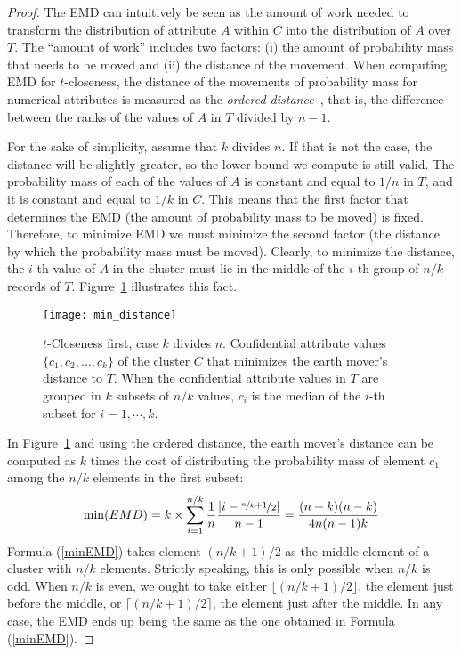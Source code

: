 \documentclass[10pt,journal,compsoc]{IEEEtran}
\theoremstyle{definition}
\theoremstyle{plain}
\begin{document}
\begin{proof}
	The EMD can intuitively be seen as the amount of work needed to transform
	the distribution of attribute $A$ within $C$ into 
the distribution of $A$ over $T$. The ``amount
	of work'' includes two factors: (i) the amount of probability mass
	that needs to be moved and (ii) the distance of the movement. When
	computing EMD for $t$-closeness, the distance of the movements
	of probability mass for numerical attributes is measured as the 
{\em ordered distance}~\cite{Li2007t-Closeness},
	that is, the difference between the ranks of the values of $A$ in $T$
	divided by $n-1$.
	
	For the sake of simplicity, assume that $k$ divides $n$. If that
	is not the case, the distance will be slightly greater, so the lower
	bound we compute is still valid. The probability mass of each of the
	values of $A$ is constant and equal to $1/n$ in $T$, and it 
is  constant and equal to $1/k$ in $C$. This means that the first
	factor that determines the EMD (the amount of probability mass
to be moved) is fixed. Therefore, to minimize 
	EMD we must minimize the second factor (the distance by which the
	probability mass must be moved). Clearly, 
to minimize the distance, the $i$-th value of $A$ in the cluster
	must lie in the middle of the $i$-th group of $n/k$ records of $T$.
	Figure~\ref{fig:min_distance} illustrates this fact.

	\begin{figure}[!t]
		\centering
		\texttt{[image: min\_distance]}
\protect\caption{$t$-Closeness first, case $k$ divides $n$. Confidential attribute values $\{c_{1},c_{2},\ldots,c_{k}\}$ of the cluster $C$
			that minimizes the earth mover's distance to $T$. When 
the confidential
			attribute values in $T$ are grouped in $k$ subsets 
of $n/k$ values, $c_i$ is the median of the $i$-th subset for $i=1,\cdots,k$. \label{fig:min_distance}}
	\end{figure}
	
	
	In Figure~\ref{fig:min_distance} and using the 
ordered distance, the earth mover's
	distance can be computed as $k$ times the cost of distributing the
	probability mass of element $c_{1}$ among the $n/k$ elements in
	the first subset:
\begin{equation}
\label{minEMD}
	\min(EMD)=k\times\sum_{i=1}^{n/k}\frac{1}{n}\frac{\left|i-\nicefrac{\nicefrac{n}{k}+1}{2}\right|}{n-1}=\frac{(n+k)(n-k)}{4n(n-1)k}
\end{equation}
	Formula (\ref{minEMD}) takes element $(n/k+1)/2$ as the middle element of a
	cluster with $n/k$ elements. Strictly speaking, this is only possible
when $n/k$ is odd.
When $n/k$ is even, we
ought to take 
either $\lfloor (n/k+1)/2 \rfloor$, the element just before
	the middle, or $\lceil (n/k+1)/2\rceil$, the element just after
	the middle. In any case, the EMD ends up being the same as the 
one obtained in Formula (\ref{minEMD}). 
\end{proof}
\end{document}
